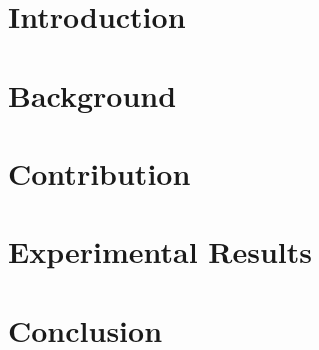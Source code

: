 \documentclass[12pt,twoside]{report}
\begin{document}



\clearpage{\pagestyle{empty}\cleardoublepage}
\setcounter{page}{1}
\pagestyle{fancy}



\begin{abstract}
    
\end{abstract}

\tableofcontents 


\clearpage{\pagestyle{empty}\cleardoublepage}
\setcounter{page}{1}
\fancyhead[LE,RO]{\slshape \rightmark}
\fancyhead[LO,RE]{\slshape \leftmark}

\chapter{Introduction}

\chapter{Background}

\chapter{Contribution}

\chapter{Experimental Results}

\chapter{Conclusion}

\printbibliography
\end{document}
